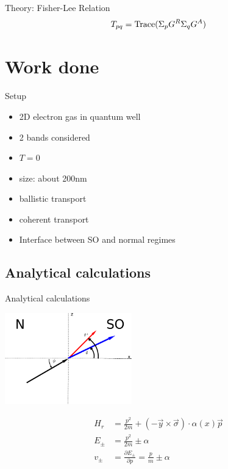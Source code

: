 \documentclass{beamer}
\begin{document}
\begin{frame}{Theory: Fisher-Lee Relation}
    \huge
    \begin{align*}
        T_{pq} = \textnormal{Trace}( \Sigma_p G^R \Sigma_q G^A )
    \end{align*}
\end{frame}

\section{Work done}
\begin{frame}{Setup}
    \begin{itemize}
        \item 2D electron gas in quantum well
        \item 2 bands considered
        \item $T = 0$
        \item size: about 200nm
        \item ballistic transport
        \item coherent transport
        \item Interface between SO and normal regimes
    \end{itemize}
\end{frame}

\subsection{Analytical calculations}

\begin{frame}{Analytical calculations}
    \begin{multicols}{2}
        \includegraphics[width=55mm]{setup-simple}

    \begin{align*}
        H_r &= \frac{p^2}{2m} + (-\vec y \times \vec \sigma) \cdot
                \alpha(x) \vec p\\ 
        E_{\pm} &= \frac{p^2}{2m} \pm \alpha \\
        v_{\pm} &= \frac{\partial E_{\pm}}{\partial p} = \frac{p}{m} \pm \alpha
    \end{align*}

    \end{multicols}
\end{frame}
\end{document}
